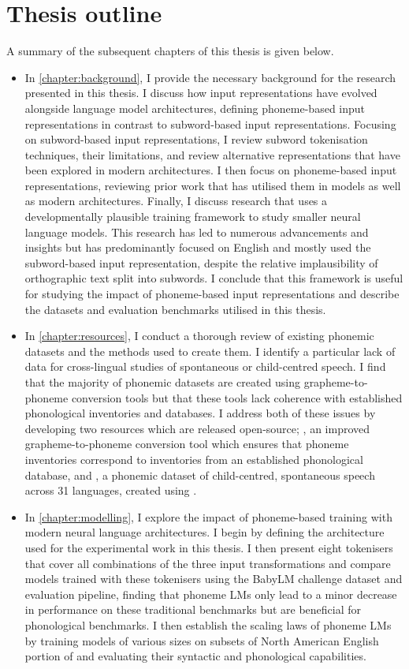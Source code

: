 \section{Thesis outline}

A summary of the subsequent chapters of this thesis is given below.

\begin{itemize}
    \item In \cref{chapter:background}, I provide the necessary background for the research presented in this thesis. I discuss how input representations have evolved alongside language model architectures, defining phoneme-based input representations in contrast to subword-based input representations. Focusing on subword-based input representations, I review subword tokenisation techniques, their limitations, and review alternative representations that have been explored in modern architectures. I then focus on phoneme-based input representations, reviewing prior work that has utilised them in \ngram models as well as modern architectures. Finally, I discuss research that uses a developmentally plausible training framework to study smaller neural language models. This research has led to numerous advancements and insights but has predominantly focused on English and mostly used the subword-based input representation, despite the relative implausibility of orthographic text split into subwords. I conclude that this framework is useful for studying the impact of phoneme-based input representations and describe the datasets and evaluation benchmarks utilised in this thesis.
    \item In \cref{chapter:resources}, I conduct a thorough review of existing phonemic datasets and the methods used to create them. I identify a particular lack of data for cross-lingual studies of spontaneous or child-centred speech. I find that the majority of phonemic datasets are created using grapheme-to-phoneme conversion tools but that these tools lack coherence with established phonological inventories and databases. I address both of these issues by developing two resources which are released open-source; \gpp, an improved grapheme-to-phoneme conversion tool which ensures that phoneme inventories correspond to inventories from an established phonological database, and \ipachildes, a phonemic dataset of child-centred, spontaneous speech across 31 languages, created using \gpp.
    \item In \cref{chapter:modelling}, I explore the impact of phoneme-based training with modern neural language architectures. I begin by defining the architecture used for the experimental work in this thesis. I then present eight tokenisers that cover all combinations of the three input transformations and compare models trained with these tokenisers using the BabyLM challenge dataset and evaluation pipeline, finding that phoneme LMs only lead to a minor decrease in performance on these traditional benchmarks but are beneficial for phonological benchmarks. I then establish the scaling laws of phoneme LMs by training models of various sizes on subsets of North American English portion of \ipachildes and evaluating their syntactic and phonological capabilities.

\end{itemize}
